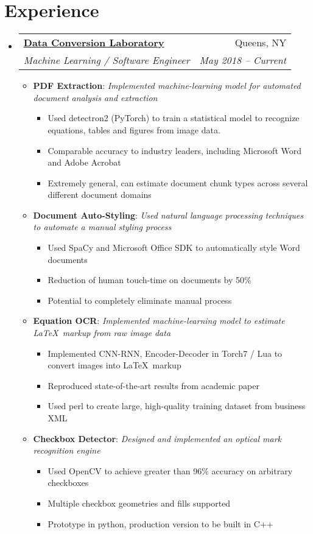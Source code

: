 \documentclass{article}
\makeatletter
\newcommand{\TwoRowSubheading}[4]{
	\item
		\begin{tabular*}{.95\textwidth}{l @{\extracolsep{\fill}} r}
			\textbf{#1} & #2 \\
			\textit{\small #3} & \textit{\small #4} \\
		\end{tabular*}\vspace{-1em}
}
\newcommand{\ListItem}[2]{
	\item \small \textbf{#1}{: \it #2}
}
\makeatother
\begin{document}
\section{Experience}
\begin{itemize}[label=\faUsers]    

	\TwoRowSubheading
		{\href{http://www.dclab.com}{Data Conversion Laboratory}}{Queens, NY}
		{Machine Learning / Software Engineer}{May 2018 -- Current}
	
	\begin{itemize}[label=\faGears] 

		\ListItem{PDF Extraction}{Implemented machine-learning model for automated document analysis and extraction}
		\begin{itemize}[label=\faGear]
			\item Used detectron2 (PyTorch) to train a statistical model to recognize equations, tables and figures from image data.
			\item Comparable accuracy to industry leaders, including Microsoft Word and Adobe Acrobat
			\item Extremely general, can estimate document chunk types across several different document domains
		\end{itemize}

		\ListItem{Document Auto-Styling}{Used natural language processing techniques to automate a manual styling process}
		\begin{itemize}[label=\faGear]
			\item Used SpaCy and Microsoft Office SDK to automatically style Word documents
			\item Reduction of human touch-time on documents by 50\%
			\item Potential to completely eliminate manual process 
		\end{itemize}

		\ListItem{Equation OCR}{Implemented machine-learning model to estimate \LaTeX\ markup from raw image data}
		\begin{itemize}[label=\faGear]
			\item Implemented CNN-RNN, Encoder-Decoder in Torch7 / Lua to convert images into \LaTeX\ markup
			\item Reproduced state-of-the-art results from academic paper
			\item Used perl to create large, high-quality training dataset from business XML
		\end{itemize}
	
		\ListItem{Checkbox Detector}{Designed and implemented an optical mark recognition engine}
		\begin{itemize}[label=\faGear]
			\item Used OpenCV to achieve greater than 96\% accuracy on arbitrary checkboxes
			\item Multiple checkbox geometries and fills supported
			\item Prototype in python, production version to be built in C++
		\end{itemize}


\end{itemize}
\end{itemize}
\end{document}
